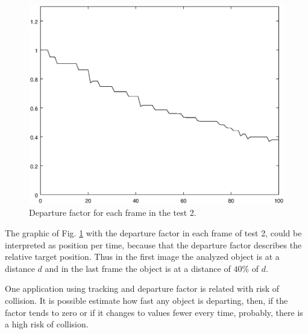 \begin{figure}[!hbt]
\includegraphics[width=\columnwidth]{images/graph2.eps}
\caption{Departure factor for each frame in the test 2.}
\label{fig:res_graph2}
\end{figure}
The graphic of Fig. \ref{fig:res_graph2} with the departure factor in each frame
of test 2, could be interpreted as position per time, 
because that the departure factor describes the relative target position.
Thus in the first image the analyzed object is at a distance $d$ and in the last frame
the object is at a distance of $40\%$ of $d$.



One application using tracking and departure factor is 
related with risk of collision. 
It is possible estimate how fast any object is departing,
then, if the factor tends to zero or if it changes to values 
fewer every time, probably, there is a high risk of collision.


